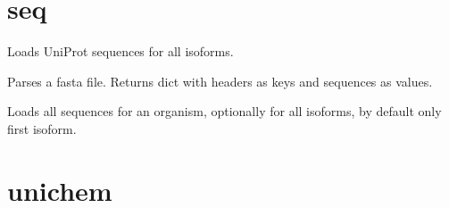 \documentclass[letterpaper,10pt,english]{sphinxmanual}
\begin{document}
\section{seq}
\label{\detokenize{reference:module-pypath.seq}}\label{\detokenize{reference:seq}}

\begin{fulllineitems}
\label{\detokenize{reference:pypath.seq.get_isoforms}}
Loads UniProt sequences for all isoforms.

\end{fulllineitems}


\begin{fulllineitems}
\label{\detokenize{reference:pypath.seq.read_fasta}}
Parses a fasta file.
Returns dict with headers as keys and sequences as values.

\end{fulllineitems}


\begin{fulllineitems}
\label{\detokenize{reference:pypath.seq.swissprot_seq}}
Loads all sequences for an organism, optionally
for all isoforms, by default only first isoform.

\end{fulllineitems}



\section{unichem}
\label{\detokenize{reference:module-pypath.unichem}}\label{\detokenize{reference:unichem}}
\end{document}
